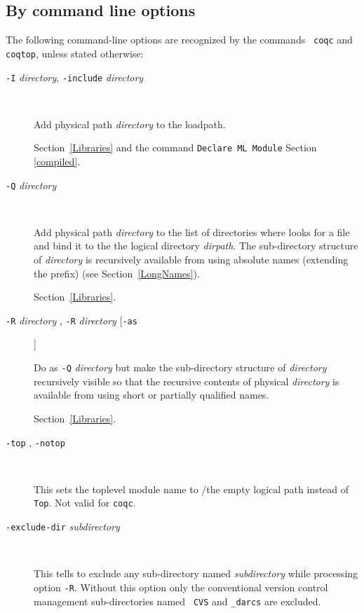 \subsection{By command line options
\label{vmoption}
\label{coqoptions}}

The following command-line options are recognized by the commands {\tt
  coqc} and {\tt coqtop}, unless stated otherwise:

\begin{description}
\item[{\tt -I} {\em directory}, {\tt -include} {\em directory}]\

Add physical path {\em directory} to the {\ocaml} loadpath.

  \SeeAlso Section~\ref{Libraries} and the command {\tt Declare ML Module} Section \ref{compiled}.

\item[\texttt{-Q} \emph{directory} {\dirpath}]\

  Add physical path \emph{directory} to the list of directories where
  {\Coq} looks for a file and bind it to the the logical directory
  \emph{dirpath}. The sub-directory structure of \emph{directory} is
  recursively available from {\Coq} using absolute names (extending
  the {\dirpath} prefix) (see Section~\ref{LongNames}).
  
  \SeeAlso Section~\ref{Libraries}.

\item[{\tt -R} {\em directory} {\dirpath}, {\tt -R} {\em directory} [{\tt -as} {\dirpath}]]\

  Do as \texttt{-Q} \emph{directory} {\dirpath} but make the
  sub-directory structure of \emph{directory} recursively visible so
  that the recursive contents of physical \emph{directory} is available
  from {\Coq} using short or partially qualified names.
  
  \SeeAlso Section~\ref{Libraries}.

\item[{\tt -top} {\dirpath}, {\tt -notop}]\ 

  This sets the toplevel module name to {\dirpath}/the empty logical path instead
  of {\tt Top}. Not valid for {\tt coqc}.

\item[{\tt -exclude-dir} {\em subdirectory}]\ 

  This tells to exclude any sub-directory named {\em subdirectory}
  while processing option {\tt -R}. Without this option only the
  conventional version control management sub-directories named {\tt
  CVS} and {\tt \_darcs} are excluded.


\end{description}
